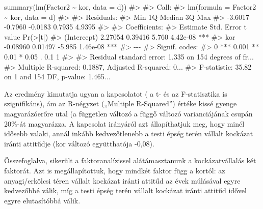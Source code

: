 \documentclass[
  letterpaper,
]{krantz}
\makeatletter
\newenvironment{Shaded}{\begin{snugshade}}{\end{snugshade}}
\newcommand{\AttributeTok}[1]{\textcolor[rgb]{0.40,0.45,0.13}{#1}}
\newcommand{\CommentTok}[1]{\textcolor[rgb]{0.37,0.37,0.37}{#1}}
\newcommand{\FunctionTok}[1]{\textcolor[rgb]{0.28,0.35,0.67}{#1}}
\newcommand{\NormalTok}[1]{\textcolor[rgb]{0.00,0.23,0.31}{#1}}
\newcommand{\SpecialCharTok}[1]{\textcolor[rgb]{0.37,0.37,0.37}{#1}}
\newenvironment{kframe}{%
\medskip{}
\setlength{\fboxsep}{.8em}
 \def\at@end@of@kframe{}%
 \ifinner\ifhmode%
  \def\at@end@of@kframe{\end{minipage}}%
  \begin{minipage}{\columnwidth}%
 \fi\fi%
 \def\FrameCommand##1{\hskip\@totalleftmargin \hskip-\fboxsep
 \colorbox{shadecolor}{##1}\hskip-\fboxsep
     \hskip-\linewidth \hskip-\@totalleftmargin \hskip\columnwidth}%
 \MakeFramed {\advance\hsize-\width
   \@totalleftmargin\z@ \linewidth\hsize
   \@setminipage}}%
 {\par\unskip\endMakeFramed%
 \at@end@of@kframe}
\renewenvironment{Shaded}{\begin{kframe}}{\end{kframe}}
\makeatother
\begin{document}
\begin{Shaded}
\begin{Highlighting}[]
\FunctionTok{summary}\NormalTok{(}\FunctionTok{lm}\NormalTok{(Factor2 }\SpecialCharTok{\textasciitilde{}}\NormalTok{ kor, }\AttributeTok{data =}\NormalTok{ d))}
\CommentTok{\#\textgreater{} }
\CommentTok{\#\textgreater{} Call:}
\CommentTok{\#\textgreater{} lm(formula = Factor2 \textasciitilde{} kor, data = d)}
\CommentTok{\#\textgreater{} }
\CommentTok{\#\textgreater{} Residuals:}
\CommentTok{\#\textgreater{}     Min      1Q  Median      3Q     Max }
\CommentTok{\#\textgreater{} {-}3.6017 {-}0.7960 {-}0.0183  0.7935  4.9395 }
\CommentTok{\#\textgreater{} }
\CommentTok{\#\textgreater{} Coefficients:}
\CommentTok{\#\textgreater{}             Estimate Std. Error t value Pr(\textgreater{}|t|)    }
\CommentTok{\#\textgreater{} (Intercept)  2.27054    0.39416   5.760 4.42e{-}08 ***}
\CommentTok{\#\textgreater{} kor         {-}0.08960    0.01497  {-}5.985 1.46e{-}08 ***}
\CommentTok{\#\textgreater{} {-}{-}{-}}
\CommentTok{\#\textgreater{} Signif. codes:  }
\CommentTok{\#\textgreater{} 0 \textquotesingle{}***\textquotesingle{} 0.001 \textquotesingle{}**\textquotesingle{} 0.01 \textquotesingle{}*\textquotesingle{} 0.05 \textquotesingle{}.\textquotesingle{} 0.1 \textquotesingle{} \textquotesingle{} 1}
\CommentTok{\#\textgreater{} }
\CommentTok{\#\textgreater{} Residual standard error: 1.335 on 154 degrees of fr...}
\CommentTok{\#\textgreater{} Multiple R{-}squared:  0.1887, Adjusted R{-}squared:  0...}
\CommentTok{\#\textgreater{} F{-}statistic: 35.82 on 1 and 154 DF,  p{-}value: 1.465...}
\end{Highlighting}
\end{Shaded}

Az eredmény kimutatja ugyan a kapcsolatot ( a t- és az F-statisztika is
szignifikáns), ám az R-négyzet („Multiple R-Squared'') értéke kissé
gyenge magyarázóerőre utal (a független változó a függő változó
varianciájának csupán 20\%-át magyarázza. A kapcsolat irányáról azt
állapíthatjuk meg, hogy minél idősebb valaki, annál inkább
kedvezőtlenebb a testi épség terén vállalt kockázat iránti attitűdje
(kor változó együtthatója -0,08).

Összefoglalva, sikerült a faktoranalízissel alátámasztanunk a
kockázatvállalás két faktorát. Azt is megállapítottuk, hogy mindkét
faktor függ a kortól: az anyagi/erkölcsi téren vállalt kockázat iránti
attitűd az évek múlásával egyre kedvezőbbé válik, míg a testi épség
terén vállalt kockázat iránti attitűd idővel egyre elutasítóbbá válik.
\end{document}
